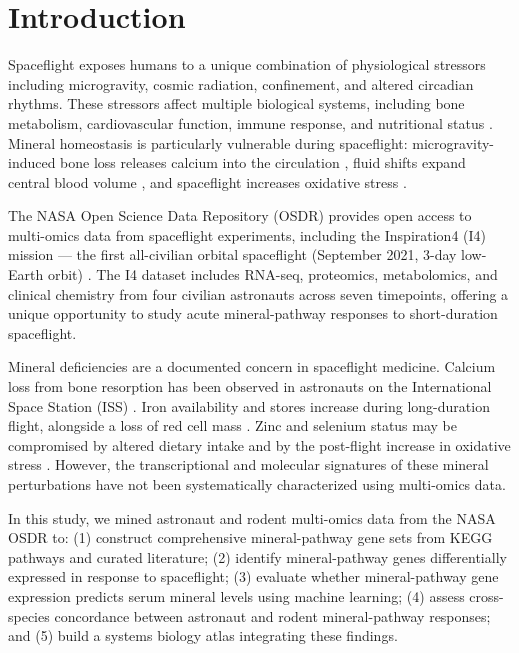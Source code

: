 \documentclass[11pt,a4paper]{article}
\begin{document}
\section{Introduction}

Spaceflight exposes humans to a unique combination of physiological stressors including microgravity, cosmic radiation, confinement, and altered circadian rhythms. These stressors affect multiple biological systems, including bone metabolism, cardiovascular function, immune response, and nutritional status \citep{williams2009}. Mineral homeostasis is particularly vulnerable during spaceflight: microgravity-induced bone loss releases calcium into the circulation \citep{smith2005}, fluid shifts expand central blood volume \citep{norsk2015}, and spaceflight increases oxidative stress \citep{stein2002}.

The NASA Open Science Data Repository (OSDR) provides open access to multi-omics data from spaceflight experiments, including the Inspiration4 (I4) mission --- the first all-civilian orbital spaceflight (September 2021, 3-day low-Earth orbit) \citep{overbey2024}. The I4 dataset includes RNA-seq, proteomics, metabolomics, and clinical chemistry from four civilian astronauts across seven timepoints, offering a unique opportunity to study acute mineral-pathway responses to short-duration spaceflight.

Mineral deficiencies are a documented concern in spaceflight medicine. Calcium loss from bone resorption has been observed in astronauts on the International Space Station (ISS) \citep{smith2015}. Iron availability and stores increase during long-duration flight, alongside a loss of red cell mass \citep{smith2002iron}. Zinc and selenium status may be compromised by altered dietary intake and by the post-flight increase in oxidative stress \citep{stein2002}. However, the transcriptional and molecular signatures of these mineral perturbations have not been systematically characterized using multi-omics data.

In this study, we mined astronaut and rodent multi-omics data from the NASA OSDR to: (1) construct comprehensive mineral-pathway gene sets from KEGG pathways and curated literature; (2) identify mineral-pathway genes differentially expressed in response to spaceflight; (3) evaluate whether mineral-pathway gene expression predicts serum mineral levels using machine learning; (4) assess cross-species concordance between astronaut and rodent mineral-pathway responses; and (5) build a systems biology atlas integrating these findings.
\end{document}
